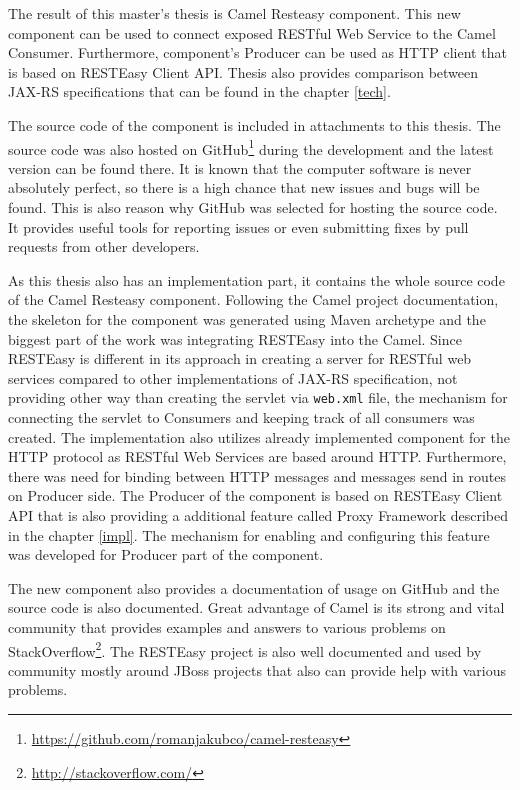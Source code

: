 \documentclass[12pt,final,oneside]{fithesis2}
\begin{document}
The result of this master's thesis is Camel Resteasy component. This new component can be used to connect exposed RESTful Web Service to the Camel Consumer. Furthermore, component's Producer can be used as HTTP client that is based on RESTEasy Client API. Thesis also provides comparison between JAX-RS specifications that can be found in the chapter \ref{tech}. 

The source code of the component is included in attachments to this thesis. The source code was also hosted on GitHub\footnote{\url{https://github.com/romanjakubco/camel-resteasy}} during the development and the latest version can be found there. It is known that the computer software is never absolutely perfect, so there is a high chance that new issues and bugs will be found. This is also reason why GitHub was selected for hosting the source code. It provides useful tools for reporting issues or even submitting fixes by pull requests from other developers.  

As this thesis also has an implementation part, it contains the whole source code of the Camel Resteasy component. Following  the Camel project documentation, the skeleton for the component was generated using Maven archetype and the biggest part of the work was integrating RESTEasy into the Camel. Since RESTEasy is different in its approach in creating a server for RESTful web services compared to other implementations of JAX-RS specification, not providing other way than creating the servlet via \texttt{web.xml} file, the mechanism for connecting the servlet to Consumers and keeping track of all consumers was created. The implementation also utilizes already implemented component for the HTTP protocol as RESTful Web Services are based around HTTP. Furthermore, there was need for binding between HTTP messages and messages send in routes on Producer side. The Producer of the component is based on RESTEasy Client API that is also providing a additional feature called Proxy Framework described in the chapter \ref{impl}. The mechanism for enabling and configuring this feature was developed for Producer part of the component.

The new component also provides a documentation of usage on GitHub and the source code is also documented. Great advantage of Camel is its strong and vital community that provides examples and answers to various problems on StackOverflow\footnote{\url{http://stackoverflow.com/}}. The RESTEasy project is also well documented and used by community mostly around JBoss projects that also can provide help with various problems.
\end{document}
